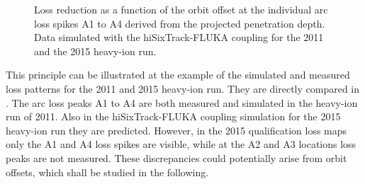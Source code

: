 \begin{figure}[b]
  \centering
  \caption{Loss reduction as a function of the orbit offset at the individual arc loss spikes A1 to A4 derived from the projected penetration depth. Data simulated with the hiSixTrack-FLUKA coupling for the 2011 and the 2015 heavy-ion run. }  
  \label{pic:16082901}
  \end{figure}

\vspace{0.2cm}

This principle can be illustrated at the example of the simulated and measured loss patterns for the 2011 and 2015 heavy-ion run. They are directly compared in . The arc loss peaks A1 to A4 are both measured and simulated in the heavy-ion run of 2011. Also in the hiSixTrack-FLUKA coupling simulation for the 2015 heavy-ion run they are predicted. However, in the 2015 qualification loss maps only the A1 and A4 loss spikes are visible, while at the A2 and A3 locations loss peaks are not measured. These discrepancies could potentially arise from orbit offsets, which shall be studied in the following. 



